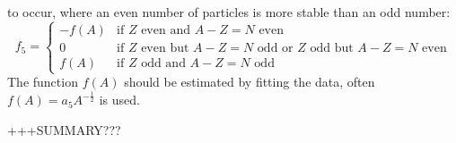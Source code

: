 \begin{itemize}
        to occur, where an even number of particles is more stable than an odd number:
      \begin{equation}
          f_5   =
          \begin{cases}
              -f(A) & \text{if $Z$ even and $A-Z=N$ even}\\
              0     & \text{if $Z$ even but $A-Z=N$ odd or $Z$ odd but $A-Z=N$ even}\\
              f(A)  & \text{if $Z$ odd and $A-Z=N$ odd}
          \end{cases}
          \label{eq:pair}
      \end{equation}
      The function $f(A)$ should be estimated by fitting the data, 
      often $f(A) = a_5 A^{-\frac{1}{2}}$ is used.
\end{itemize}
+++SUMMARY???

